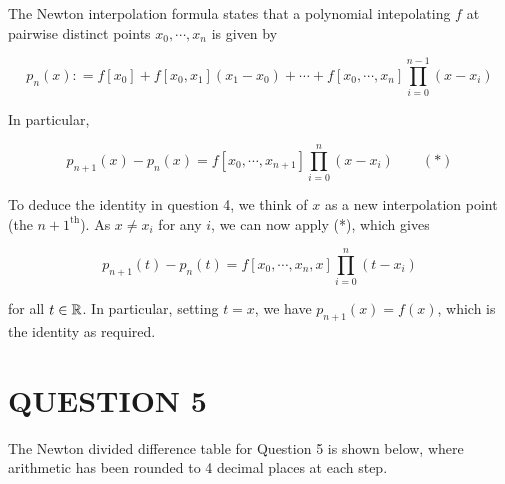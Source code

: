 \documentclass[a4paper]{article}
\begin{document}
%
%
%
%
%
%
%
%
%

The Newton interpolation formula states that a polynomial intepolating $ f $ at pairwise distinct points $ x_{0},\cdots,x_{n} $ is given by 

\[ p_{n}(x) : = f[x_{0}] + f[x_{0},x_{1}](x_{1} - x_{0}) + \cdots + f[x_{0},\cdots,x_{n}]\prod_{i=0}^{n-1} (x - x_{i})  \] 

In particular,

\[ p_{n+1}(x) - p_{n}(x) = f[x_{0},\cdots,x_{n+1}] \prod_{i=0}^{n} (x - x_{i}) \qquad (*)  \]



To deduce the identity in question 4, we think of $ x $ as a new interpolation point (the $ n+1^{\text{th}} $). As $ x \neq x_{i} $ for any $ i $, we can now apply (*), which gives

\[ p_{n+1}(t) - p_{n}(t) = f[x_{0},\cdots,x_{n},x] \prod_{i=0}^{n} (t - x_{i})  \]

for all $ t \in \mathbb{R} $. In particular, setting $ t = x $, we have $ p_{n+1}(x) = f(x) $, which is the identity as required. 


 
 




\section{QUESTION 5}

The Newton divided difference table for Question 5 is shown below, where arithmetic has been rounded to 4 decimal places at each step.
\end{document}
